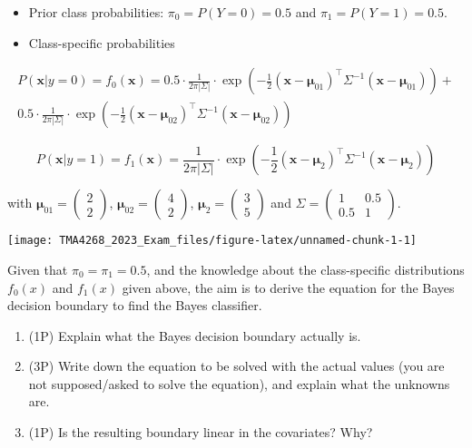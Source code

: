 \documentclass[
]{article}
\providecommand{\tightlist}{%
  \setlength{\itemsep}{0pt}\setlength{\parskip}{0pt}}
\begin{document}
\begin{itemize}
\tightlist
\item
  Prior class probabilities: \(\pi_0 = P(Y=0) = 0.5\) and
  \(\pi_1= P(Y = 1) = 0.5\).
\item
  Class-specific probabilities
\end{itemize}

\begin{align*}
P(\bm{x}|y=0) = f_0(\bm{x})=
0.5 \cdot \frac{1}{2\pi |\Sigma|} \cdot \exp\left( -\frac{1}{2} (\bm{x}-\bm{\mu}_{01})^\top \Sigma^{-1} (\bm{x}- \bm{\mu}_{01})\right) + \\
 0.5 \cdot \frac{1}{2\pi |\Sigma|} \cdot \exp\left(- \frac{1}{2} (\bm{x}-\bm{\mu}_{02})^\top \Sigma^{-1} (\bm{x}- \bm{\mu}_{02})\right)
\end{align*}

\[
P(\bm{x}|y=1) = f_1(\bm{x})=
\frac{1}{2\pi |\Sigma|} \cdot \exp\left(-\frac{1}{2} (\bm{x}-\bm{\mu}_{2})^\top\Sigma^{-1}(\bm{x}-\bm{\mu}_{2})\right) 
\]

with \(\bm{\mu}_{01}=\begin{pmatrix}2 \\ 2 \end{pmatrix}\),
\(\bm{\mu}_{02}=\begin{pmatrix}4 \\ 2 \end{pmatrix}\),
\(\bm{\mu}_{2}=\begin{pmatrix}3 \\ 5 \end{pmatrix}\) and
\(\Sigma = \begin{pmatrix} 1 & 0.5 \\0.5 & 1\end{pmatrix}\).

\texttt{[image: TMA4268\_2023\_Exam\_files/figure-latex/unnamed-chunk-1-1]}

Given that \(\pi_0=\pi_1=0.5\), and the knowledge about the
class-specific distributions \(f_0(x)\) and \(f_1(x)\) given above, the
aim is to derive the equation for the Bayes decision boundary to find
the Bayes classifier.

\begin{enumerate}
\def\labelenumi{(\roman{enumi})}
\tightlist
\item
  (1P) Explain what the Bayes decision boundary actually is.
\item
  (3P) Write down the equation to be solved with the actual values (you
  are not supposed/asked to solve the equation), and explain what the
  unknowns are.
\item
  (1P) Is the resulting boundary linear in the covariates? Why?
\end{enumerate}
\end{document}
